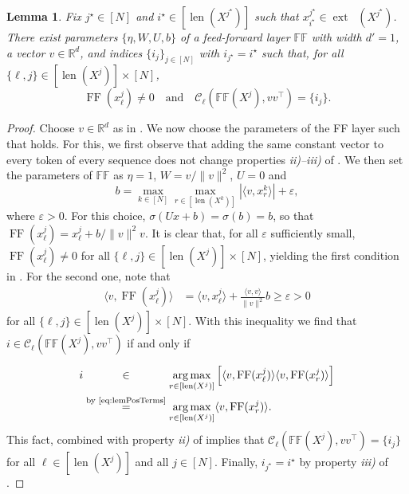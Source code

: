 \documentclass[pdflatex,sn-mathphys-num]{sn-jnl}%
\theoremstyle{thmstyleone}%
\newtheorem{lemma}[theorem]{Lemma}
\theoremstyle{thmstyletwo}%
\theoremstyle{thmstylethree}%
\numberwithin{equation}{section}
\newcommand{\R}{\mathbb{R}}
\DeclareMathOperator{\FF}{\mathrm{FF}}
\DeclareMathOperator{\co}{\overline{co}}
\DeclareMathOperator{\ext}{ext}
\newcommand{\ip}[2]{\langle #1, #2 \rangle}
\newcommand{\C}{\mathcal{C}}
\DeclareMathOperator*{\argmax}{arg\,max}
\DeclareMathOperator{\len}{len}
\begin{document}
\begin{lemma}\label{lem:chooseLeader}
Fix $j^\star \in [N]$ and $i^\star \in [\len (X^{j^\star})]$ such that $x_{i^\star}^{j^\star} \in \ext\co(X^{j^\star})$. There exist parameters $\{ \eta, W, U, b\}$ of a feed-forward layer $\mathbb{FF}$ with width $d' = 1$, a vector $v\in \R^d$, and indices $\{i_j\}_{j\in [N]}$ with $i_{j^\star} = i^\star$ such that, for all $\{\ell, j\}\in [\len (X^j)]\times [N]$,
\begin{equation}\label{eq:chooseLeaderLemma}
   \FF(x_\ell^j) \neq 0 
   \quad\text{and}\quad
    \C_\ell(\mathbb{FF}(X^j), vv^\top) = \{ i_j \}.
\end{equation}
\end{lemma}
\begin{proof}
Choose $v\in\R^d$ as in . We now choose the parameters of the FF layer such that  holds. For this, we first observe that adding the same constant vector to every token of every sequence does not change properties \textit{ii)--iii)} of . We then set the parameters of $\mathbb{FF}$ as $\eta =1$, $W = v / \| v \|^2$, $U = 0$ and 
\begin{equation*}
    b = \max_{k\in [N]} \max_{r\in [\len(X^k)]}| \ip{v}{x_r^k}| + \varepsilon,
\end{equation*} 
where $\varepsilon > 0$. For this choice, $\sigma(Ux + b) = \sigma (b) = b$, so that $\FF(x_\ell^j) = x_\ell^j + b/ {\| v \|^2} v$. It is clear that, for all $\varepsilon$ sufficiently small, $\FF(x_\ell^j) \neq 0$ for all $\{\ell, j\}\in [\len(X^j)]\times [N]$, yielding the first condition in . For the second one, note that
\begin{align}\label{eq:lemPosTerms}
    \ip{v}{\FF({x}_\ell^j)} &= \ip{v}{x_\ell^j} +  \frac{\ip{v}{v}}{\|v\|^2} b \geq \varepsilon > 0 
\end{align}
for all $\{ \ell, j\} \in [\len(X^j)] \times [N]$. With this inequality we find that $i\in \C_\ell (\mathbb{FF}(X^j), vv^\top)$ if and only if
\begin{equation*}
\begin{aligned}
    i &\overset{\phantom{\text{by \Cref{eq:lemPosTerms}}}}{\in}\argmax_{r \in [\len (X^j)]} \left[ \ip{v}{\FF(x^j_\ell)} \ip{v}{\FF(x_r^j)} \right] \\
    &\overset{\text{by \Cref{eq:lemPosTerms}}}{=} \argmax_{r \in [\len (X^j)]}  \ip{v}{\FF(x_r^j)}.
\end{aligned}
\end{equation*}
This fact, combined with property \textit{ii)} of  implies that $\C_\ell(\mathbb{FF}(X^j), vv^\top) = \{ i_j \}$ for all $\ell \in [\len(X^j)]$ and all $j\in [N]$. Finally, $i_{j^\star} = i^\star$ by property \textit{iii)} of . 
\end{proof}
\end{document}
